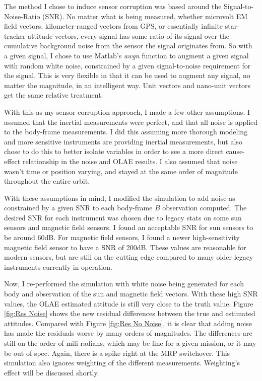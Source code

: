 \documentclass[11pt]{aiaa-tc}%
\begin{document}
The method I chose to induce sensor corruption was based around the Signal-to-Noise-Ratio (SNR). No matter what is being measured, whether microvolt EM field vectors, kilometer-ranged vectors from GPS, or essentially infinite star-tracker attitude vectors, every signal has some ratio of its signal over the cumulative background noise from the sensor the signal originates from. So with a given signal, I chose to use Matlab's \emph{awgn} function to augment a given signal with random white noise, constrained by a given signal-to-noise requirement for the signal. This is very flexible in that it can be used to augment any signal, no matter the magnitude, in an intelligent way. Unit vectors and nano-unit vectors get the same relative treatment. 

With this as my sensor corruption approach, I made a few other assumptions. I assumed that the inertial measurements were perfect, and that all noise is applied to the body-frame measurements. I did this assuming more thorough modeling and more sensitive instruments are providing inertial measurements, but also chose to do this to better isolate variables in order to see a more direct cause-effect relationship in the noise and OLAE results. I also assumed that noise wasn't time or position varying, and stayed at the same order of magnitude throughout the entire orbit. 

With these assumptions in mind, I modified the simulation to add noise as constrained by a given SNR to each body-frame $B$ observation computed. The desired SNR for each instrument was chosen due to legacy stats on some sun sensors and magnetic field sensors. I found an acceptable SNR for sun sensors to be around 60dB\cite{SunTracker}. For magnetic field sensors, I found a newer high-sensitivity magnetic field sensor to have a SNR of 200dB\cite{MagSensor}. These values are reasonable for modern sensors, but are still on the cutting edge compared to many older legacy instruments currently in operation. 

Now, I re-performed the simulation with white noise being generated for each body and observation of the sun and magnetic field vectors. With these high SNR values, the OLAE estimated attitude is still very close to the truth value. Figure \ref{fig:Res Noise} shows the new residual differences between the true and estimated attitudes. Compared with Figure \ref{fig:Res No Noise}, it is clear that adding noise has made the residuals worse by many orders of magnitudes. The differences are still on the order of mili-radians, which may be fine for a given mission, or it may be out of spec. Again, there is a spike right at the MRP switchover. This simulation also ignores weighting of the different measurements. Weighting's effect will be discussed shortly. 
\end{document}
